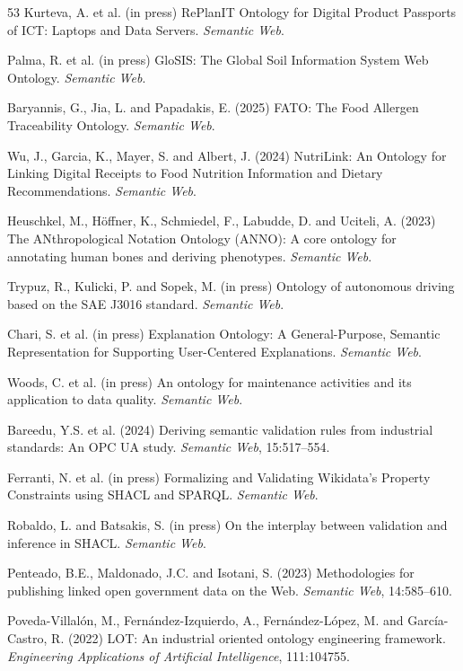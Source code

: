 \documentclass[Afour,sagev,times]{sagej}
\begin{document}
\begin{thebibliography}{53}
 Kurteva, A. et al. (in press) RePlanIT Ontology for Digital Product Passports of ICT: Laptops and Data Servers. \emph{Semantic Web}.

 Palma, R. et al. (in press) GloSIS: The Global Soil Information System Web Ontology. \emph{Semantic Web}.

 Baryannis, G., Jia, L. and Papadakis, E. (2025) FATO: The Food Allergen Traceability Ontology. \emph{Semantic Web}.

 Wu, J., Garcia, K., Mayer, S. and Albert, J. (2024) NutriLink: An Ontology for Linking Digital Receipts to Food Nutrition Information and Dietary Recommendations. \emph{Semantic Web}.

 Heuschkel, M., H\"offner, K., Schmiedel, F., Labudde, D. and Uciteli, A. (2023) The ANthropological Notation Ontology (ANNO): A core ontology for annotating human bones and deriving phenotypes. \emph{Semantic Web}.

 Trypuz, R., Kulicki, P. and Sopek, M. (in press) Ontology of autonomous driving based on the SAE J3016 standard. \emph{Semantic Web}.

 Chari, S. et al. (in press) Explanation Ontology: A General-Purpose, Semantic Representation for Supporting User-Centered Explanations. \emph{Semantic Web}.

 Woods, C. et al. (in press) An ontology for maintenance activities and its application to data quality. \emph{Semantic Web}.

 Bareedu, Y.S. et al. (2024) Deriving semantic validation rules from industrial standards: An OPC UA study. \emph{Semantic Web}, 15:517--554.

 Ferranti, N. et al. (in press) Formalizing and Validating Wikidata's Property Constraints using SHACL and SPARQL. \emph{Semantic Web}.

 Robaldo, L. and Batsakis, S. (in press) On the interplay between validation and inference in SHACL. \emph{Semantic Web}.

 Penteado, B.E., Maldonado, J.C. and Isotani, S. (2023) Methodologies for publishing linked open government data on the Web. \emph{Semantic Web}, 14:585--610.

 Poveda-Villal\'on, M., Fern\'andez-Izquierdo, A., Fern\'andez-L\'opez, M. and Garc\'ia-Castro, R. (2022) LOT: An industrial oriented ontology engineering framework. \emph{Engineering Applications of Artificial Intelligence}, 111:104755.


\end{thebibliography}
\end{document}
